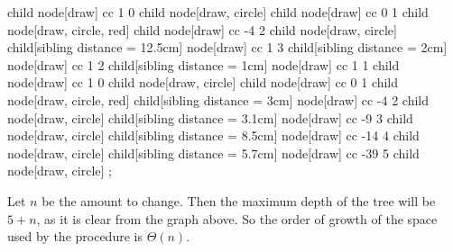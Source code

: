 {{{{{{                  child { node[draw] { \ntt cc 1 0 } 
                    child { node[draw, circle] {  } }
                  }
                  child { node[draw] { \ntt cc 0 1 } 
                    child { node[draw, circle, red] {  } }
                  }
                }
                child { node[draw] { \ntt cc -4 2 } 
                  child { node[draw, circle] {  } }
                }
              }
            }
          }
          child[sibling distance = 12.5cm] { node[draw] { \ntt cc 1 3 } 
            child[sibling distance = 2cm] { node[draw] { \ntt cc 1 2 } 
              child[sibling distance = 1cm] { node[draw] { \ntt cc 1 1 } 
                child { node[draw] { \ntt cc 1 0 } 
                  child { node[draw, circle] {  } }
                }
                child { node[draw] { \ntt cc 0 1 } 
                  child { node[draw, circle, red] {  } }
                }
              }
              child[sibling distance = 3cm] { node[draw] { \ntt cc -4 2 } 
                child { node[draw, circle] {  } }
              }
            }
            child[sibling distance = 3.1cm] { node[draw] { \ntt cc -9 3 } 
              child { node[draw, circle] {  } }
            }
          }
        }
        child[sibling distance = 8.5cm] { node[draw] { \ntt cc -14 4 } 
          child { node[draw, circle] {  } }
        }
    }
    child[sibling distance = 5.7cm] { node[draw] { \ntt cc -39 5 } 
      child { node[draw, circle] {  } }
    };
\endtikzpicture

Let $n$ be the amount to change.  Then the maximum depth of the tree will be $5 + n$, as it is clear from the graph above.  So the order of growth of the space used by the  procedure is $\Theta(n)$.
